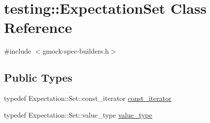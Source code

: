 \hypertarget{classtesting_1_1_expectation_set}{}\section{testing\+:\+:Expectation\+Set Class Reference}
\label{classtesting_1_1_expectation_set}


{\ttfamily \#include $<$gmock-\/spec-\/builders.\+h$>$}

\subsection*{Public Types}
\begin{DoxyCompactItemize}
\item 
typedef Expectation\+::\+Set\+::const\+\_\+iterator \hyperlink{classtesting_1_1_expectation_set_ab269a45f80d8c4f747b29de454a084bb}{const\+\_\+iterator}
\item 
typedef Expectation\+::\+Set\+::value\+\_\+type \hyperlink{classtesting_1_1_expectation_set_aab6d2d4800cec231bcedae33deaca7f6}{value\+\_\+type}
\end{DoxyCompactItemize}
